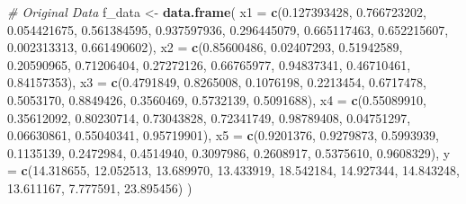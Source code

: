 \documentclass[
]{article}
\newenvironment{Shaded}{\begin{snugshade}}{\end{snugshade}}
\newcommand{\AttributeTok}[1]{\textcolor[rgb]{0.13,0.29,0.53}{#1}}
\newcommand{\CommentTok}[1]{\textcolor[rgb]{0.56,0.35,0.01}{\textit{#1}}}
\newcommand{\FloatTok}[1]{\textcolor[rgb]{0.00,0.00,0.81}{#1}}
\newcommand{\FunctionTok}[1]{\textcolor[rgb]{0.13,0.29,0.53}{\textbf{#1}}}
\newcommand{\NormalTok}[1]{#1}
\newcommand{\OtherTok}[1]{\textcolor[rgb]{0.56,0.35,0.01}{#1}}
\begin{document}
\begin{Shaded}
\begin{Highlighting}[]

\CommentTok{\# Original Data}
\NormalTok{f\_data }\OtherTok{\textless{}{-}} \FunctionTok{data.frame}\NormalTok{(}
  \AttributeTok{x1 =} \FunctionTok{c}\NormalTok{(}\FloatTok{0.127393428}\NormalTok{, }\FloatTok{0.766723202}\NormalTok{, }\FloatTok{0.054421675}\NormalTok{, }\FloatTok{0.561384595}\NormalTok{, }\FloatTok{0.937597936}\NormalTok{,}
         \FloatTok{0.296445079}\NormalTok{, }\FloatTok{0.665117463}\NormalTok{, }\FloatTok{0.652215607}\NormalTok{, }\FloatTok{0.002313313}\NormalTok{, }\FloatTok{0.661490602}\NormalTok{),}
  \AttributeTok{x2 =} \FunctionTok{c}\NormalTok{(}\FloatTok{0.85600486}\NormalTok{, }\FloatTok{0.02407293}\NormalTok{, }\FloatTok{0.51942589}\NormalTok{, }\FloatTok{0.20590965}\NormalTok{, }\FloatTok{0.71206404}\NormalTok{,}
         \FloatTok{0.27272126}\NormalTok{, }\FloatTok{0.66765977}\NormalTok{, }\FloatTok{0.94837341}\NormalTok{, }\FloatTok{0.46710461}\NormalTok{, }\FloatTok{0.84157353}\NormalTok{),}
  \AttributeTok{x3 =} \FunctionTok{c}\NormalTok{(}\FloatTok{0.4791849}\NormalTok{, }\FloatTok{0.8265008}\NormalTok{, }\FloatTok{0.1076198}\NormalTok{, }\FloatTok{0.2213454}\NormalTok{, }\FloatTok{0.6717478}\NormalTok{,}
         \FloatTok{0.5053170}\NormalTok{, }\FloatTok{0.8849426}\NormalTok{, }\FloatTok{0.3560469}\NormalTok{, }\FloatTok{0.5732139}\NormalTok{, }\FloatTok{0.5091688}\NormalTok{),}
  \AttributeTok{x4 =} \FunctionTok{c}\NormalTok{(}\FloatTok{0.55089910}\NormalTok{, }\FloatTok{0.35612092}\NormalTok{, }\FloatTok{0.80230714}\NormalTok{, }\FloatTok{0.73043828}\NormalTok{, }\FloatTok{0.72341749}\NormalTok{,}
         \FloatTok{0.98789408}\NormalTok{, }\FloatTok{0.04751297}\NormalTok{, }\FloatTok{0.06630861}\NormalTok{, }\FloatTok{0.55040341}\NormalTok{, }\FloatTok{0.95719901}\NormalTok{),}
  \AttributeTok{x5 =} \FunctionTok{c}\NormalTok{(}\FloatTok{0.9201376}\NormalTok{, }\FloatTok{0.9279873}\NormalTok{, }\FloatTok{0.5993939}\NormalTok{, }\FloatTok{0.1135139}\NormalTok{, }\FloatTok{0.2472984}\NormalTok{,}
         \FloatTok{0.4514940}\NormalTok{, }\FloatTok{0.3097986}\NormalTok{, }\FloatTok{0.2608917}\NormalTok{, }\FloatTok{0.5375610}\NormalTok{, }\FloatTok{0.9608329}\NormalTok{),}
  \AttributeTok{y =} \FunctionTok{c}\NormalTok{(}\FloatTok{14.318655}\NormalTok{, }\FloatTok{12.052513}\NormalTok{, }\FloatTok{13.689970}\NormalTok{, }\FloatTok{13.433919}\NormalTok{, }\FloatTok{18.542184}\NormalTok{,}
        \FloatTok{14.927344}\NormalTok{, }\FloatTok{14.843248}\NormalTok{, }\FloatTok{13.611167}\NormalTok{, }\FloatTok{7.777591}\NormalTok{, }\FloatTok{23.895456}\NormalTok{)}
\NormalTok{  )}



\end{Highlighting}
\end{Shaded}
\end{document}
